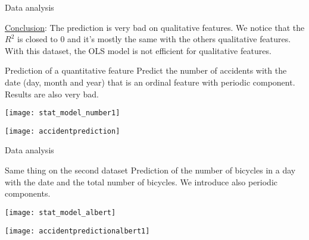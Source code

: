 \documentclass[unknownkeysallowed]{beamer}
\begin{document}
\begin{frame}{Data analysis}

\underline{Conclusion}:
The prediction is very bad on qualitative features. We notice that the $R^2$ is closed to 0 and it's mostly the same with the others qualitative features. With this dataset, the OLS model is not efficient for qualitative features.

\begin{exampleblock}{Prediction of a quantitative feature}
Predict the number of accidents with the date (day, month and year) that is an ordinal feature with periodic component. Results are also very bad.

\end{exampleblock}

\begin{minipage}[c]{.36\linewidth}
     \begin{center}
             \texttt{[image: stat\_model\_number1]}
         \end{center}
   \end{minipage} \hfill
   \begin{minipage}[c]{.55\linewidth}
    \begin{center}
            \texttt{[image: accidentprediction]}

        \end{center}

 \end{minipage}

\end{frame}


\begin{frame}{Data analysis}

\begin{exampleblock}{Same thing on the second dataset}
Prediction of the number of bicycles in a day with the date and the total number of bicycles. We introduce also periodic components.
\end{exampleblock}


\begin{minipage}[c]{.36\linewidth}
     \begin{center}
             \texttt{[image: stat\_model\_albert]}
         \end{center}
   \end{minipage} \hfill
   \begin{minipage}[c]{.55\linewidth}
    \begin{center}
            \texttt{[image: accidentpredictionalbert1]}

        \end{center}

 \end{minipage}
\end{frame}
\end{document}
